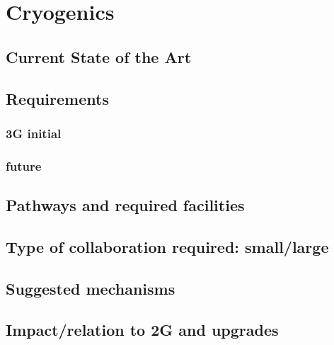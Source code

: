 \section{Cryogenics}
\subsection{Current State of the Art}
\subsection{Requirements}
\subsubsection{3G initial}
\subsubsection{future}
\subsection{Pathways and required facilities}
\subsection{Type of collaboration required:  small/large}
\subsection{Suggested mechanisms}
\subsection{Impact/relation to 2G and upgrades}